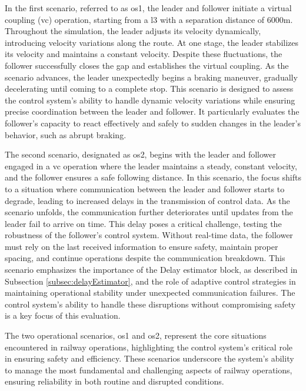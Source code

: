 	In the first scenario, referred to as \gls{os}1, the leader and follower initiate a virtual coupling (\gls{vc}) operation, starting from a \gls{l3} with a separation distance of $6000\unit{\meter}$. Throughout the simulation, the leader adjusts its velocity dynamically, introducing velocity variations along the route. At one stage, the leader stabilizes its velocity and maintains a constant velocity. Despite these fluctuations, the follower successfully closes the gap and establishes the virtual coupling. As the scenario advances, the leader unexpectedly begins a braking maneuver, gradually decelerating until coming to a complete stop. This scenario is designed to assess the control system’s ability to handle dynamic velocity variations while ensuring precise coordination between the leader and follower. It particularly evaluates the follower’s capacity to react effectively and safely to sudden changes in the leader’s behavior, such as abrupt braking.
	
	The second scenario, designated as \gls{os}2, begins with the leader and follower engaged in a \gls{vc} operation where the leader maintains a steady, constant velocity, and the follower ensures a safe following distance. In this scenario, the focus shifts to a situation where communication between the leader and follower starts to degrade, leading to increased delays in the transmission of control data. As the scenario unfolds, the communication further deteriorates until updates from the leader fail to arrive on time. This delay poses a critical challenge, testing the robustness of the follower’s control system. Without real-time data, the follower must rely on the last received information to ensure safety, maintain proper spacing, and continue operations despite the communication breakdown. This scenario emphasizes the importance of the Delay estimator block, as described in Subsection \ref{subsec:delayEstimator}, and the role of adaptive control strategies in maintaining operational stability under unexpected communication failures. The control system’s ability to handle these disruptions without compromising safety is a key focus of this evaluation.
	
	
	The two operational scenarios, \gls{os}1 and \gls{os}2, represent the core situations encountered in railway operations, highlighting the control system's critical role in ensuring safety and efficiency. These scenarios underscore the system’s ability to manage the most fundamental and challenging aspects of railway operations, ensuring reliability in both routine and disrupted conditions.
	
